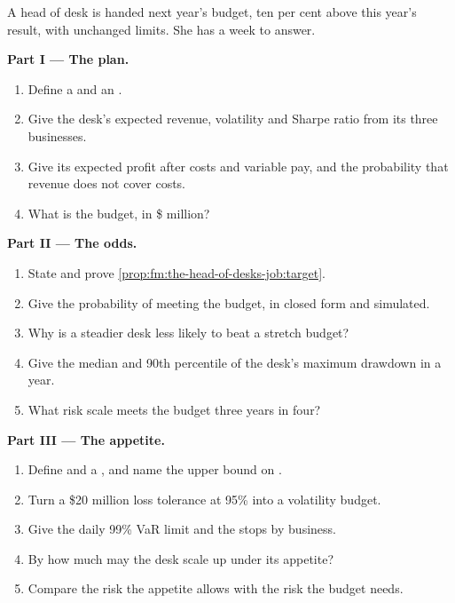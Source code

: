 \begin{problem}\label{pb:fm:the-head-of-desks-job:1}
A head of desk is handed next year's budget, ten per cent above this year's result, with unchanged limits. She has a week to answer.

\medskip\noindent\textbf{Part I --- The plan.}
\begin{enumerate}
\item Define a  and an .
\item Give the desk's expected revenue, volatility and Sharpe ratio from its three businesses.
\item Give its expected profit after costs and variable pay, and the probability that revenue does not cover costs.
\item What is the budget, in \$ million?
\end{enumerate}

\medskip\noindent\textbf{Part II --- The odds.}
\begin{enumerate}[resume]
\item State and prove \cref{prop:fm:the-head-of-desks-job:target}.
\item Give the probability of meeting the budget, in closed form and simulated.
\item Why is a steadier desk less likely to beat a stretch budget?
\item Give the median and 90th percentile of the desk's maximum drawdown in a year.
\item What risk scale meets the budget three years in four?
\end{enumerate}

\medskip\noindent\textbf{Part III --- The appetite.}
\begin{enumerate}[resume]
\item Define  and a , and name the upper bound on .
\item Turn a \$20 million loss tolerance at 95\% into a volatility budget.
\item Give the daily 99\% VaR limit and the stops by business.
\item By how much may the desk scale up under its appetite?
\item Compare the risk the appetite allows with the risk the budget needs.
\end{enumerate}


\end{problem}
